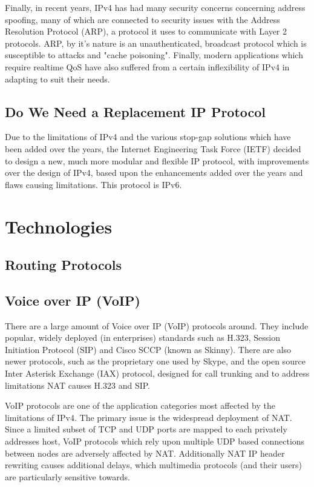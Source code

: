 \documentclass[a4paper,12pt]{article}
\begin{document}
Finally, in recent years, IPv4 has had many security concerns concerning
address spoofing, many of which are connected to security issues with
the Address Resolution Protocol (ARP), a protocol it uses to communicate
with Layer 2 protocols. ARP, by it's nature is an unauthenticated, 
broadcast protocol which is susceptible to attacks and "cache poisoning".
Finally, modern applications which require realtime QoS have also 
suffered from a certain inflexibility of IPv4 in adapting to suit their 
needs.

\subsection{Do We Need a Replacement IP Protocol}

Due to the limitations of IPv4 and the various stop-gap solutions which
have been added over the years, the Internet Engineering Task Force
(IETF) decided to design a new, much more modular and flexible IP
protocol, with improvements over the design of IPv4, based upon the
enhancements added over the years and flaws causing limitations. This
protocol is IPv6.

\section{Technologies}

\subsection{Routing Protocols}


\subsection{Voice over IP (VoIP)}

There are a large amount of Voice over IP (VoIP) protocols around. They
include popular, widely deployed (in enterprises) standards such as 
H.323, Session Initiation Protocol (SIP) and Cisco SCCP (known as
Skinny). There are also newer protocols, such as the proprietary one used
by Skype, and the open source Inter Asterisk Exchange (IAX) protocol,
designed for call trunking and to address limitations NAT causes H.323
and SIP.


VoIP protocols are one of the application categories most affected by
the limitations of IPv4. The primary issue is the widespread deployment
of NAT. Since a limited subset of TCP and UDP ports are mapped to each
privately addresses host, VoIP protocols which rely upon multiple UDP
based connections between nodes are adversely affected by NAT.
Additionally NAT IP header rewriting causes additional delays, which 
multimedia protocols (and their users) are particularly sensitive 
towards.
\end{document}

